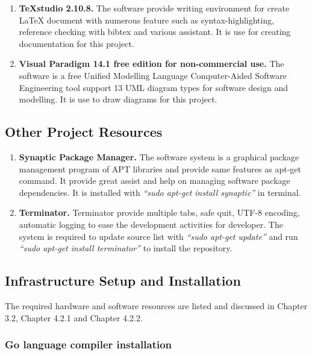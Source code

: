 \begin{enumerate}[topsep=0pt,itemsep=-1ex,partopsep=1ex,parsep=1.5ex]
\item \textbf{TeXstudio 2.10.8. } The software provide writing environment for create LaTeX document with numerous feature such as syntax-highlighting, reference checking with bibtex and various assistant. It is use for creating documentation for this project.
\pagebreak
\item \textbf{Visual Paradigm 14.1 free edition for non-commercial use.} The software is a free Unified Modelling Language Computer-Aided Software Engineering tool support 13 UML diagram types for software design and modelling. It is use to draw diagrams for this project. 

\end{enumerate}


\subsection{Other Project Resources}
\begin{enumerate}[topsep=0pt,itemsep=-1ex,partopsep=1ex,parsep=1.5ex]
	\item \textbf{Synaptic Package Manager. } The software system is a graphical package management program of APT libraries and provide same features as apt-get command. It provide great assist and help on managing software package dependencies. It is installed with \textit{“sudo apt-get install synaptic”} in terminal. 
	
	\item \textbf{Terminator.} Terminator provide multiple tabs, safe quit, UTF-8 encoding, automatic logging to ease the development activities for developer. The system is required to update source list with \textit{“sudo apt-get update”} and run \textit{“sudo apt-get install terminator”} to install the repository.
		
\end{enumerate}

\pagebreak

\subsection{Infrastructure Setup and Installation}

The required hardware and software resources are listed and discussed in Chapter 3.2, Chapter 4.2.1 and Chapter 4.2.2. 

\subsubsection{Go language compiler installation}

